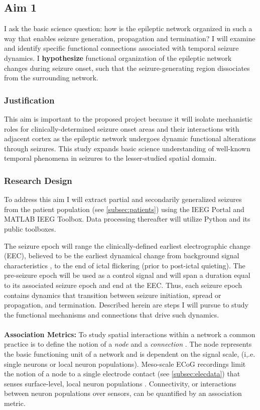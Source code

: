 \subsection{Aim 1}
\label{rsappr:aim1}
I ask the basic science question: how is the epileptic network organized in such a way that enables seizure generation, propagation and termination? I will examine and identify specific functional connections associated with temporal seizure dynamics. I \textbf{hypothesize} functional organization of the epileptic network changes during seizure onset, such that the seizure-generating region dissociates from the surrounding network.

\subsubsection{Justification}
This aim is important to the proposed project because it will isolate mechanistic roles for clinically-determined seizure onset areas and their interactions with adjacent cortex as the epileptic network undergoes dynamic functional alterations through seizures. This study expands basic science understanding of well-known temporal phenomena in seizures to the lesser-studied spatial domain.

\subsubsection{Research Design}
To address this aim I will extract partial and secondarily generalized seizures from the patient population (see \ref{subsec:patients}) using the IEEG Portal and MATLAB IEEG Toolbox. Data processing thereafter will utilize Python and its public toolboxes.

The seizure epoch will range the clinically-defined earliest electrographic change (EEC), believed to be the earliest dynamical change from background signal characteristics \cite{litt2001epileptic}, to the end of ictal flickering (prior to post-ictal quieting). The pre-seizure epoch will be used as a control signal and will span a duration equal to its associated seizure epoch and end at the EEC. Thus, each seizure epoch contains dynamics that transition between seizure initiation, spread or propagation, and termination. Described herein are steps I will pursue to study the functional mechanisms and connections that drive such dynamics.
~\\
~\\
\textbf{Association Metrics:}
To study spatial interactions within a network a common practice is to define the notion of a \textit{node} and a \textit{connection} \cite{bullmore2011brain}. The node represents the basic functioning unit of a network and is dependent on the signal scale, (i,.e. single neurons or local neuron populations). Meso-scale ECoG recordings limit the notion of a node to a single electrode contact (see \ref{subsec:elecdata}) that senses surface-level, local neuron populations \cite{buzsaki2012origin}. Connectivity, or interactions between neuron populations over sensors, can be quantified by an association metric.

